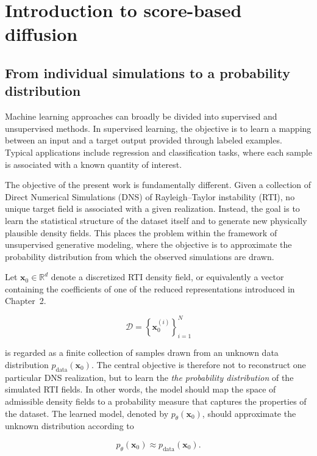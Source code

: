 \section{Introduction to score-based diffusion}

\subsection{From individual simulations to a probability distribution}

Machine learning approaches can broadly be divided into supervised and unsupervised methods. In supervised learning, the objective is to learn a mapping between an input and a target output provided through labeled examples. Typical applications include regression and classification tasks, where each sample is associated with a known quantity of interest.

The objective of the present work is fundamentally different. Given a collection of Direct Numerical Simulations (DNS) of Rayleigh--Taylor instability (RTI), no unique target field is associated with a given realization. Instead, the goal is to learn the statistical structure of the dataset itself and to generate new physically plausible density fields. This places the problem within the framework of unsupervised generative modeling, where the objective is to approximate the probability distribution from which the observed simulations are drawn.

Let $\mathbf{x}_0\in\mathbb{R}^{d}$ denote a discretized RTI density field, or equivalently a vector containing the coefficients of one of the reduced representations introduced in Chapter~2.

\begin{equation}
    \mathcal{D}=\left\{\mathbf{x}_0^{(i)}\right\}_{i=1}^{N}
\end{equation}

is regarded as a finite collection of samples drawn from an unknown data
distribution $p_{\mathrm{data}}(\mathbf{x}_0)$. The central objective is therefore not to reconstruct one particular DNS realization, but to
learn the \emph{the probability distribution} of the simulated RTI
fields. In other words, the model should map the space of admissible density fields to a probability measure that captures the properties of the dataset.
The learned model, denoted by $p_{\theta}(\mathbf{x}_0)$, should approximate the
unknown distribution according to

\begin{equation}
    p_{\theta}(\mathbf{x}_0)\approx
    p_{\mathrm{data}}(\mathbf{x}_0).
\end{equation}

